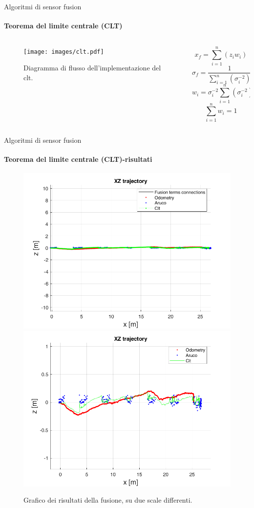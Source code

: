 \documentclass{beamer}
\begin{document}
\begin{frame}{Algoritmi di sensor fusion}
\framesubtitle{Teorema del limite centrale (CLT)}
\begin{columns}
    \begin{column}{0.6\textwidth}
    \begin{figure}
        \centering
        \texttt{[image: images/clt.pdf]}
        \caption{Diagramma di flusso dell'implementazione del clt.}
    \end{figure}
    \end{column}
    \begin{column}{0.4\textwidth}
    $$ x_{f} = \sum_{i=1}^{n}(z_{i}w_{i})$$
    $$ \sigma_{f} = \frac{1}{\sum_{i=1}^{n}(\sigma_{i}^{-2})} $$
    $$ w_{i} = \sigma_{i}^{-2}\sum_{i=1}^{n}(\sigma_{i}^{-2})$$
    $$\sum_{i=1}^{n} w_i = 1$$
\end{column}
\end{columns}
\end{frame}

\begin{frame}{Algoritmi di sensor fusion}
\framesubtitle{Teorema del limite centrale (CLT)-risultati}
    \begin{figure}
        \centering
        \includegraphics[width=.4\textwidth]{images/cltexpaxeq.png}
        \includegraphics[width=.4\textwidth]{images/cltexp.png}
        \caption{Grafico dei risultati della fusione, su due scale differenti.}
    \end{figure}
\end{frame}
\end{document}
